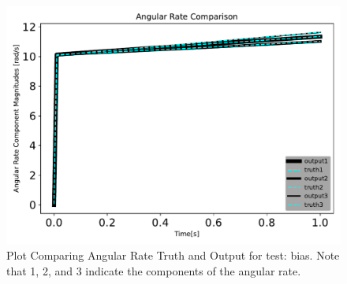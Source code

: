 \begin{figure}[htbp]\centerline{\includegraphics[height=0.7\textwidth, keepaspectratio]{AutoTeX/biasomegaComparison}}\caption{Plot Comparing Angular Rate Truth and Output for test: bias. Note that 1, 2, and 3 indicate the components of the angular rate.}\label{fig:biasomegaComparison}\end{figure}